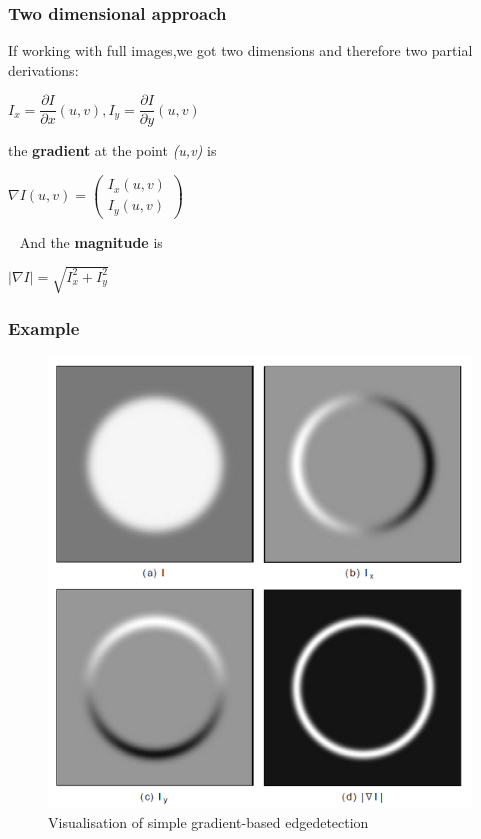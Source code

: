 \begin{frame}
	\frametitle{Two dimensional approach}
	If working with full images,we got two dimensions and therefore two partial derivations:
	\begin{center}	
		$I_x = \dfrac{\partial I}{\partial x}(u,v) , I_y = \dfrac{\partial I}{\partial y}(u,v)$
	\end{center}
	the \textbf{gradient} at the point \textit{(u,v)} is \newline
	\begin{center}
		$\nabla I(u,v) =  \begin{pmatrix}I_x(u,v) \\ I_y(u,v)\end{pmatrix}$
	\end{center}	
	~\newline
	And the \textbf{magnitude} is \newline
	\begin{center}
		$|\nabla I|=\sqrt{I_x^2 + I_y^2}$
	\end{center}
\end{frame}

\begin{frame}
	\frametitle{Example}
	\begin{figure}
		\centering
		\includegraphics[width=0.5\linewidth]{images/2DEdgeGradient}
		\caption{Visualisation of simple gradient-based edgedetection}
		\label{fig:2dedgegradient}
	\end{figure}
\end{frame}

